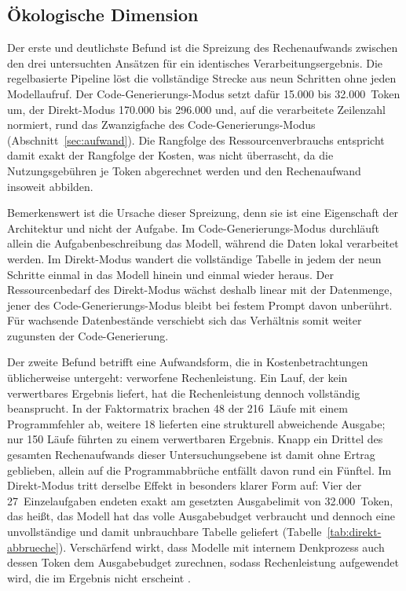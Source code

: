 \subsection{Ökologische Dimension}
\label{subsec:nachhaltigkeit-oekologisch}

Der erste und deutlichste Befund ist die Spreizung des Rechenaufwands zwischen den drei untersuchten Ansätzen für ein identisches Verarbeitungsergebnis. Die regelbasierte Pipeline löst die vollständige Strecke aus neun Schritten ohne jeden Modellaufruf. Der Code-Generierungs-Modus setzt dafür 15.000 bis 32.000~Token um, der Direkt-Modus 170.000 bis 296.000 und, auf die verarbeitete Zeilenzahl normiert, rund das Zwanzigfache des Code-Generierungs-Modus (Abschnitt~\ref{sec:aufwand}). Die Rangfolge des Ressourcenverbrauchs entspricht damit exakt der Rangfolge der Kosten, was nicht überrascht, da die Nutzungsgebühren je Token abgerechnet werden und den Rechenaufwand insoweit abbilden.

Bemerkenswert ist die Ursache dieser Spreizung, denn sie ist eine Eigenschaft der Architektur und nicht der Aufgabe. Im Code-Generierungs-Modus durchläuft allein die Aufgabenbeschreibung das Modell, während die Daten lokal verarbeitet werden. Im Direkt-Modus wandert die vollständige Tabelle in jedem der neun Schritte einmal in das Modell hinein und einmal wieder heraus. Der Ressourcenbedarf des Direkt-Modus wächst deshalb linear mit der Datenmenge, jener des Code-Generierungs-Modus bleibt bei festem Prompt davon unberührt. Für wachsende Datenbestände verschiebt sich das Verhältnis somit weiter zugunsten der Code-Generierung.

Der zweite Befund betrifft eine Aufwandsform, die in Kostenbetrachtungen üblicherweise untergeht: verworfene Rechenleistung. Ein Lauf, der kein verwertbares Ergebnis liefert, hat die Rechenleistung dennoch vollständig beansprucht. In der Faktormatrix brachen 48 der 216~Läufe mit einem Programmfehler ab, weitere 18 lieferten eine strukturell abweichende Ausgabe; nur 150 Läufe führten zu einem verwertbaren Ergebnis. Knapp ein Drittel des gesamten Rechenaufwands dieser Untersuchungsebene ist damit ohne Ertrag geblieben, allein auf die Programmabbrüche entfällt davon rund ein Fünftel. Im Direkt-Modus tritt derselbe Effekt in besonders klarer Form auf: Vier der 27~Einzelaufgaben endeten exakt am gesetzten Ausgabelimit von 32.000~Token, das heißt, das Modell hat das volle Ausgabebudget verbraucht und dennoch eine unvollständige und damit unbrauchbare Tabelle geliefert (Tabelle~\ref{tab:direkt-abbrueche}). Verschärfend wirkt, dass Modelle mit internem Denkprozess auch dessen Token dem Ausgabebudget zurechnen, sodass Rechenleistung aufgewendet wird, die im Ergebnis nicht erscheint \autocite{changEfficientPromptingMethods2024}.

